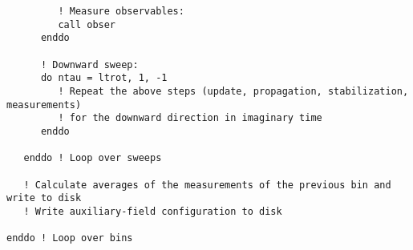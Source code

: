 \begin{lstlisting}
         ! Measure observables:
         call obser
      enddo
      
      ! Downward sweep:
      do ntau = ltrot, 1, -1
         ! Repeat the above steps (update, propagation, stabilization, measurements) 
         ! for the downward direction in imaginary time
      enddo
      
   enddo ! Loop over sweeps
    
   ! Calculate averages of the measurements of the previous bin and write to disk
   ! Write auxiliary-field configuration to disk
   
enddo ! Loop over bins        

\end{lstlisting}

